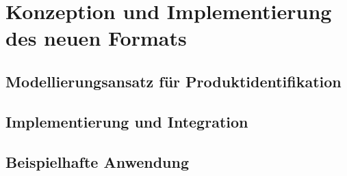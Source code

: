 \chapter{Konzeption und Implementierung des neuen Formats}


\section{Modellierungsansatz für Produktidentifikation}\label{sec:modellierungsansatz}


\section{Implementierung und Integration}\label{sec:implementierung}


\section{Beispielhafte Anwendung}
